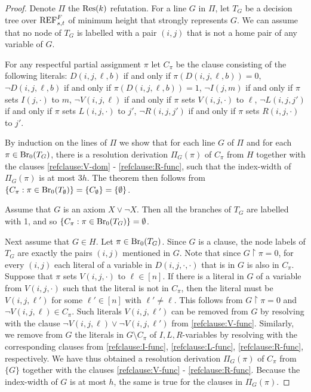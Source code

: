 \begin{proof}
Denote $\Pi$ the  $\textnormal{Res}(k)$ refutation. For a line $G$ in $\Pi$, let $T_G$ be a decision tree over $\textnormal{REF}^{F}_{s,t}$ of minimum height that strongly represents $G$. We can assume that no node of $T_G$ is labelled with a pair $(i,j)$ that is not a home pair of any variable of $G$.

For any respectful partial assignment $\pi$ let $C_{\pi}$ be the clause consisting of the following literals: $D(i,j,\ell,b)$ if and only if $\pi(D(i,j,\ell,b)) = 0$, $\neg D(i,j,\ell,b)$ if and only if $\pi(D(i,j,\ell,b)) = 1$, $\neg I(j,m)$ if and only if $\pi$ sets $I(j, \cdot)$ to $m$, $\neg V(i,j,\ell)$ if and only if $\pi$ sets $V(i,j,\cdot)$ to $\ell$, $\neg L(i,j,j')$ if and only if $\pi$ sets $L(i,j,\cdot)$ to $j'$, $\neg R(i,j,j')$ if and only if $\pi$ sets $R(i,j,\cdot)$ to $j'$. 

By induction on the lines of $\Pi$ we show that for each line $G$ of $\Pi$ and for each $\pi \in \textnormal{Br}_0(T_G)$, there is a resolution derivation $\Pi_G(\pi)$ of $C_{\pi}$ from $H$ together with the clauses \eqref{refclause:V-dom} - \eqref{refclause:R-func}, such that the index-width of $\Pi_G(\pi)$ is at most $3h$. The theorem then follows from $\{C_{\pi} : \pi \in \textnormal{Br}_0(T_{\emptyset})\} = \{C_{\emptyset}\} = \{\emptyset\}$. 

Assume that $G$ is an axiom $X \lor \neg X$. Then all the branches of $T_G$ are labelled with 1, and so $\{C_{\pi} : \pi \in \textnormal{Br}_0(T_G)\} = \emptyset$.

Next assume that $G \in H$. Let $\pi \in \textnormal{Br}_0(T_G)$. Since $G$ is a clause, the node labels of $T_G$ are exactly the pairs $(i,j)$ mentioned in $G$. Note that since $G \! \restriction \! \pi = 0$, for every $(i,j)$ each literal of a variable in $D(i,j,\cdot, \cdot)$ that is in $G$ is also in $C_{\pi}$. Suppose that $\pi$ sets $V(i,j,\cdot)$ to $\ell \in [n]$. If there is a literal in $G$ of a variable from $V(i,j,\cdot)$ such that the literal is not in $C_{\pi}$, then the literal must be $V(i,j,\ell')$ for some $\ell' \in [n]$ with $\ell' \neq \ell$. This follows from $G \! \restriction \! \pi = 0$ and $\neg V(i,j,\ell) \in C_{\pi}$. Such literals $V(i,j,\ell')$ can be removed from $G$ by resolving with the clause $\neg V(i,j,\ell) \lor \neg V(i,j,\ell')$ from \eqref{refclause:V-func}. Similarly, we remove from $G$ the literals in $G \setminus C_{\pi}$ of $I,L,R$-variables by resolving with the corresponding clauses from \eqref{refclause:I-func}, \eqref{refclause:L-func}, \eqref{refclause:R-func}, respectively. We have thus obtained a resolution derivation $\Pi_G(\pi)$ of $C_{\pi}$ from $\{G\}$ together with the clauses \eqref{refclause:V-func} - \eqref{refclause:R-func}. Because the index-width of $G$ is at most $h$, the same is true for the clauses in $\Pi_G(\pi)$.


\end{proof}
